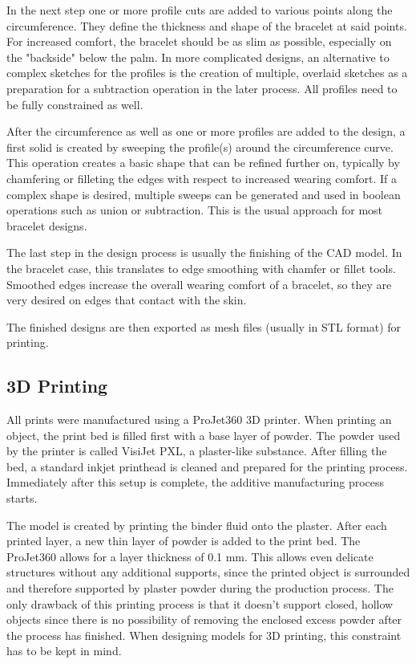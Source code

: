 In the next step one or more profile cuts are added to various points along the circumference. They define the thickness and shape of the bracelet at said points. For increased comfort, the bracelet should be as slim as possible, especially on the "backside" below the palm. In more complicated designs, an alternative to complex sketches for the profiles is the creation of multiple, overlaid sketches as a preparation for a subtraction operation in the later process. All profiles need to be fully constrained as well.

After the circumference as well as one or more profiles are added to the design, a first solid is created by sweeping the profile(s) around the circumference curve. This operation creates a basic shape that can be refined further on, typically by chamfering or filleting the edges with respect to increased wearing comfort. If a complex shape is desired, multiple sweeps can be generated and used in boolean operations such as union or subtraction. This is the usual approach for most bracelet designs.

The last step in the design process is usually the finishing of the \ac{CAD} model. In the bracelet case, this translates to edge smoothing with chamfer or fillet tools. Smoothed edges increase the overall wearing comfort of a bracelet, so they are very desired on edges that contact with the skin.

The finished designs are then exported as mesh files (usually in \ac{STL} format) for printing.

\subsection{3D Printing}
All prints were manufactured using a ProJet360 3D printer\cite{printer}. When printing an object, the print bed is filled first with a base layer of powder. The powder used by the printer is called VisiJet PXL, a plaster-like substance. After filling the bed, a standard inkjet printhead is cleaned and prepared for the printing process. Immediately after this setup is complete, the additive manufacturing process starts.

The model is created by printing the binder fluid onto the plaster. After each printed layer, a new thin layer of powder is added to the print bed. The ProJet360 allows for a layer thickness of 0.1 mm\cite{datasheet_printer}. This allows even delicate structures without any additional supports, since the printed object is surrounded and therefore supported by plaster powder during the production process. The only drawback of this printing process is that it doesn't support closed, hollow objects since there is no possibility of removing the enclosed excess powder after the process has finished. When designing models for 3D printing, this constraint has to be kept in mind.

